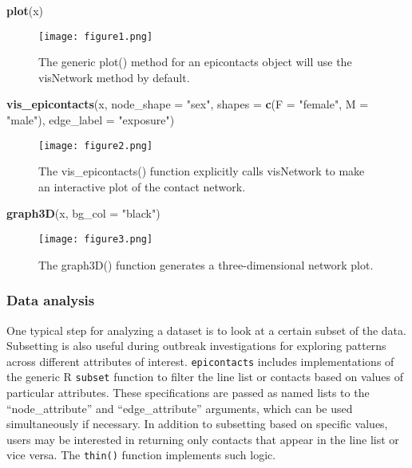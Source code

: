 \documentclass[9pt,a4paper,]{extarticle}
\newenvironment{Shaded}{\begin{snugshade}}{\end{snugshade}}
\newcommand{\KeywordTok}[1]{\textcolor[rgb]{0.13,0.29,0.53}{\textbf{#1}}}
\newcommand{\DataTypeTok}[1]{\textcolor[rgb]{0.13,0.29,0.53}{#1}}
\newcommand{\StringTok}[1]{\textcolor[rgb]{0.31,0.60,0.02}{#1}}
\newcommand{\NormalTok}[1]{#1}
\theoremstyle{definition}
\theoremstyle{definition}
\theoremstyle{definition}
\theoremstyle{remark}
\begin{document}
\begin{Shaded}
\begin{Highlighting}[]
\KeywordTok{plot}\NormalTok{(x)}
\end{Highlighting}
\end{Shaded}

\begin{figure}
\centering
\texttt{[image: figure1.png]}
\caption{The generic plot() method for an epicontacts object will use the visNetwork method by default.}
\end{figure}

\begin{Shaded}
\begin{Highlighting}[]
\KeywordTok{vis_epicontacts}\NormalTok{(x,}
                \DataTypeTok{node_shape =} \StringTok{"sex"}\NormalTok{,}
                \DataTypeTok{shapes =} \KeywordTok{c}\NormalTok{(}\DataTypeTok{F =} \StringTok{"female"}\NormalTok{, }\DataTypeTok{M =} \StringTok{"male"}\NormalTok{),}
                \DataTypeTok{edge_label =} \StringTok{"exposure"}\NormalTok{)}
\end{Highlighting}
\end{Shaded}

\begin{figure}
\centering
\texttt{[image: figure2.png]}
\caption{The vis\_epicontacts() function explicitly calls visNetwork to make an interactive plot of the contact network.}
\end{figure}

\begin{Shaded}
\begin{Highlighting}[]
\KeywordTok{graph3D}\NormalTok{(x, }\DataTypeTok{bg_col =} \StringTok{"black"}\NormalTok{)}
\end{Highlighting}
\end{Shaded}

\begin{figure}
\centering
\texttt{[image: figure3.png]}
\caption{The graph3D() function generates a three-dimensional network plot.}
\end{figure}

\subsubsection{Data analysis}\label{data-analysis}

One typical step for analyzing a dataset is to look at a certain subset of the data. Subsetting is also useful during outbreak investigations for exploring patterns across different attributes of interest. \texttt{epicontacts} includes implementations of the generic R \texttt{subset} function to filter the line list or contacts based on values of particular attributes. These specifications are passed as named lists to the ``node\_attribute'' and ``edge\_attribute'' arguments, which can be used simultaneously if necessary. In addition to subsetting based on specific values, users may be interested in returning only contacts that appear in the line list or vice versa. The \texttt{thin()} function implements such logic.
\end{document}
